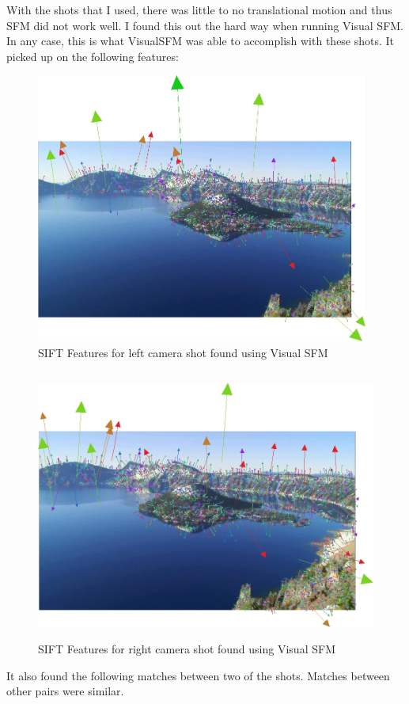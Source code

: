 \documentclass[11pt,psfig]{article}
\begin{document}
With the shots that I used, there was little to no translational motion and thus SFM did not work well. I found this out the hard way when running Visual SFM. In any case, this is what VisualSFM was able to accomplish with these shots. It picked up on the following features:
\begin{figure}[H]
\centering
\includegraphics[height=3.5in]{sfmResults1/shotFeatures_4.jpg}
\caption{SIFT Features for left camera shot found using Visual SFM}
\end{figure}
\begin{figure}[H]
\centering
\includegraphics[height=3.5in]{sfmResults1/shotFeatures_26.jpg}
\caption{SIFT Features for right camera shot found using Visual SFM}
\end{figure}
\newpage
It also found the following matches between two of the shots. Matches between other pairs were similar. 
\end{document}
